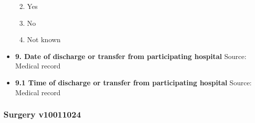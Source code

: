 \documentclass[
]{scrartcl}
\providecommand{\tightlist}{%
  \setlength{\itemsep}{0pt}\setlength{\parskip}{0pt}}\usepackage{longtable,booktabs,array}
\begin{document}
\begin{itemize}
  \begin{enumerate}
  \def\labelenumi{\arabic{enumi}.}
  \tightlist
  \item
    Yes
  \item
    No
  \item
    Not known
  \end{enumerate}
\item
  \textbf{9. Date of discharge or transfer from participating hospital}
  Source: Medical record
\item
  \textbf{9.1 Time of discharge or transfer from participating hospital}
  Source: Medical record
\end{itemize}

\hypertarget{surgery-v10011024}{%
\subsubsection{Surgery v10011024}\label{surgery-v10011024}}
\end{document}
